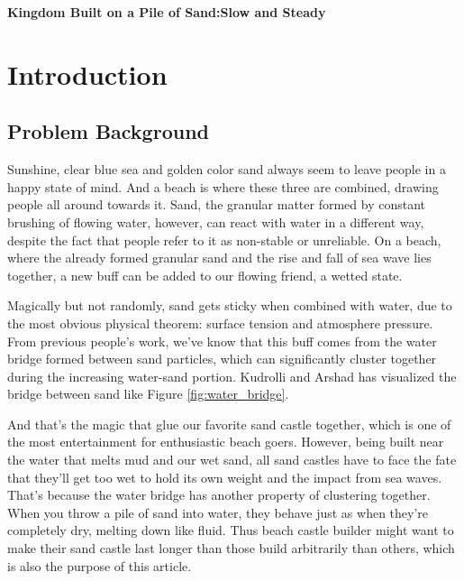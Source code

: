 \documentclass[12pt]{article}
\begin{document}
\clearpage
\pagestyle{fancy}


\begin{center}
    \Large \textbf{Kingdom Built on a Pile of Sand:Slow and Steady}
\end{center}

\newpage

\tableofcontents
\newpage
\setcounter{page}{1}

\section{Introduction}
\subsection{Problem Background}
\par
Sunshine, clear blue sea and golden color sand always seem to leave people in a happy state of mind.
And a beach is where these three are combined, drawing people all around towards it. Sand, the granular matter formed by constant brushing of flowing water, however, can react with water in a different way, despite the fact that people refer to it as non-stable or unreliable. On a beach, where the already formed granular sand and the rise and fall of sea wave lies together, a new buff can be added to our flowing friend, a wetted state.
\par
Magically but not randomly, sand gets sticky when combined with water, due to the most obvious physical theorem: surface tension and atmosphere pressure. From previous people's work, we've know that this buff comes from the water bridge formed between sand particles, which can significantly cluster together during the increasing water-sand portion\autocite{pakpour2012construct,mitarai2006wet,kudrolli2008sticky}. Kudrolli and Arshad has visualized the bridge between sand like Figure \ref{fig:water_bridge}.
\par
And that's the magic that glue our favorite sand castle together, which is one of the most entertainment for enthusiastic beach goers. However, being built near the water that melts mud and our wet sand, all sand castles have to face the fate that they'll get too wet to hold its own weight and the impact from sea waves. That's because the water bridge has another property of clustering together\autocite{kudrolli2008sticky}. When you throw a pile of sand into water, they behave just as when they're completely dry, melting down like fluid. Thus beach castle builder might want to make their sand castle last longer than those build arbitrarily than others, which is also the purpose of this article.
\end{document}
